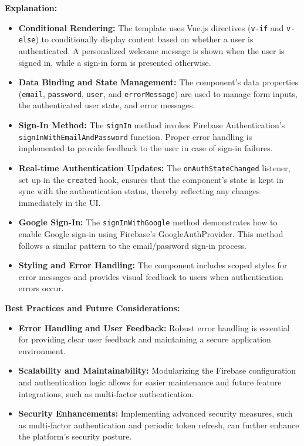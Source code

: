 \vspace{1em}
\textbf{Explanation:}
\begin{itemize}
    \item \textbf{Conditional Rendering:} The template uses Vue.js directives (\texttt{v-if} and \texttt{v-else}) to conditionally display content based on whether a user is authenticated. A personalized welcome message is shown when the user is signed in, while a sign-in form is presented otherwise.
    \item \textbf{Data Binding and State Management:} The component’s data properties (\texttt{email}, \texttt{password}, \texttt{user}, and \texttt{errorMessage}) are used to manage form inputs, the authenticated user state, and error messages.
    \item \textbf{Sign-In Method:} The \texttt{signIn} method invokes Firebase Authentication’s \texttt{signInWithEmailAndPassword} function. Proper error handling is implemented to provide feedback to the user in case of sign-in failures.
    \item \textbf{Real-time Authentication Updates:} The \texttt{onAuthStateChanged} listener, set up in the \texttt{created} hook, ensures that the component’s state is kept in sync with the authentication status, thereby reflecting any changes immediately in the UI.
    \item \textbf{Google Sign-In:} The \texttt{signInWithGoogle} method demonstrates how to enable Google sign-in using Firebase’s GoogleAuthProvider. This method follows a similar pattern to the email/password sign-in process.
    \item \textbf{Styling and Error Handling:} The component includes scoped styles for error messages and provides visual feedback to users when authentication errors occur.
\end{itemize}

\textbf{Best Practices and Future Considerations:}
\begin{itemize}
    \item \textbf{Error Handling and User Feedback:} Robust error handling is essential for providing clear user feedback and maintaining a secure application environment.
    \item \textbf{Scalability and Maintainability:} Modularizing the Firebase configuration and authentication logic allows for easier maintenance and future feature integrations, such as multi-factor authentication.
    \item \textbf{Security Enhancements:} Implementing advanced security measures, such as multi-factor authentication and periodic token refresh, can further enhance the platform’s security posture.
\end{itemize}

